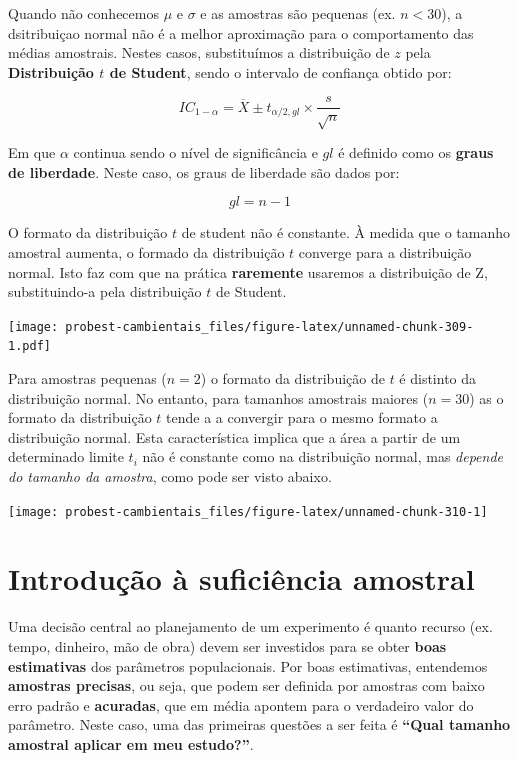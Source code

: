 \documentclass[
]{book}
\begin{document}
Quando não conhecemos \(\mu\) e \(\sigma\) e as amostras são pequenas (ex. \(n<30\)), a dsitribuiçao normal não é a melhor aproximação para o comportamento das médias amostrais. Nestes casos, substituímos a distribuição de \(z\) pela \textbf{Distribuição \(t\) de Student}, sendo o intervalo de confiança obtido por:

\[IC_{1-\alpha} = \overline{X} \pm t_{\alpha/2, gl} \times \frac{s}{\sqrt{n}}\]

Em que \(\alpha\) continua sendo o nível de significância e \(gl\) é definido como os \textbf{graus de liberdade}. Neste caso, os graus de liberdade são dados por:

\[gl = n-1\]

O formato da distribuição \(t\) de student não é constante. À medida que o tamanho amostral aumenta, o formado da distribuição \(t\) converge para a distribuição normal. Isto faz com que na prática \textbf{raremente} usaremos a distribuição de Z, substituindo-a pela distribuição \(t\) de Student.

\texttt{[image: probest-cambientais\_files/figure-latex/unnamed-chunk-309-1.pdf]}

Para amostras pequenas (\(n = 2\)) o formato da distribuição de \(t\) é distinto da distribuição normal. No entanto, para tamanhos amostrais maiores (\(n = 30\)) as o formato da distribuição \(t\) tende a a convergir para o mesmo formato a distribuição normal. Esta característica implica que a área a partir de um determinado limite \(t_i\) não é constante como na distribuição normal, mas \emph{depende do tamanho da amostra}, como pode ser visto abaixo.

\begin{center}\texttt{[image: probest-cambientais\_files/figure-latex/unnamed-chunk-310-1]} \end{center}

\hypertarget{introduuxe7uxe3o-uxe0-suficiuxeancia-amostral}{%
\section{Introdução à suficiência amostral}\label{introduuxe7uxe3o-uxe0-suficiuxeancia-amostral}}

Uma decisão central ao planejamento de um experimento é quanto recurso (ex. tempo, dinheiro, mão de obra) devem ser investidos para se obter \textbf{boas estimativas} dos parâmetros populacionais. Por boas estimativas, entendemos \textbf{amostras precisas}, ou seja, que podem ser definida por amostras com baixo erro padrão e \textbf{acuradas}, que em média apontem para o verdadeiro valor do parâmetro. Neste caso, uma das primeiras questões a ser feita é \textbf{``Qual tamanho amostral aplicar em meu estudo?''}.
\end{document}
